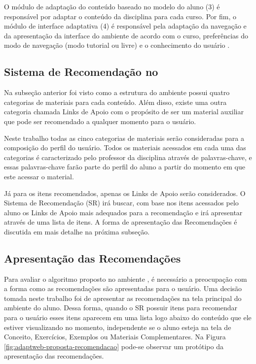 O módulo de adaptação do conteúdo baseado no modelo do aluno (3) é responsável por adaptar o conteúdo da disciplina
para cada curso. Por fim, o módulo de interface adaptativa (4) é responsável pela adaptação da navegação e da
apresentação da interface do ambiente de acordo com o curso, preferências do modo de navegação (modo tutorial ou livre)
e o conhecimento do usuário \cite{gasparini2003interface}.

\subsection{Sistema de Recomendação no \adaptweb}

Na subseção anterior foi visto como a estrutura do ambiente \adaptweb possui quatro categorias
de materiais para cada conteúdo. Além disso, existe uma outra categoria chamada Links de Apoio com o propósito de ser um
material auxiliar que pode ser recomendado a qualquer momento para o usuário.

Neste trabalho todas as cinco categorias de materiais serão consideradas para a composição do perfil do usuário. Todos os
materiais acessados em cada uma das categorias é caracterizado pelo professor da disciplina através de palavras-chave, e
essas palavras-chave farão parte do perfil do aluno a partir do momento em que este acessar o material.

Já para os itens recomendados, apenas os Links de Apoio serão considerados. O Sistema de Recomendação (SR) irá buscar, com
base nos itens acessados pelo aluno os Links de Apoio mais adequados para a recomendação e irá apresentar através de uma
lista de itens. A forma de apresentação das Recomendações é discutida em mais detalhe na próxima subseção.

\subsection{Apresentação das Recomendações}

Para avaliar o algoritmo proposto no ambiente \adaptweb, é necessário a preocupação com a
forma como as recomendações são apresentadas para o usuário. Uma decisão tomada neste trabalho foi de apresentar as
recomendações na tela principal do ambiente do aluno. Dessa forma, quando o SR possuir itens para recomendar para o usuário
esses itens aparecem em uma lista logo abaixo do conteúdo que ele estiver visualizando no momento, independente se o aluno esteja na
tela de Conceito, Exercícios, Exemplos ou Materiais Complementares. Na Figura \ref{fig:adaptweb-proposta-recomendacao}
pode-se observar um protótipo da apresentação das recomendações.

